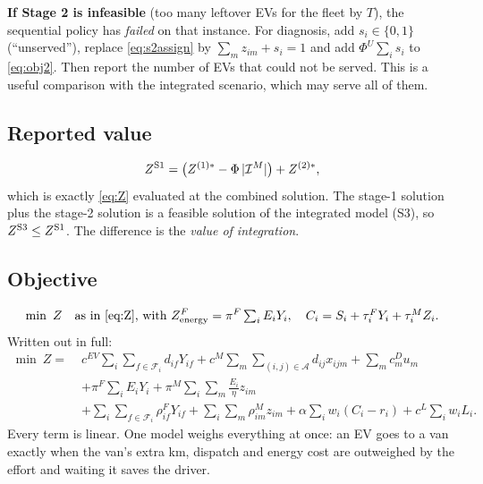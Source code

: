 \documentclass[11pt,a4paper]{article}
\newif\ifTOU \TOUfalse   %
\newcommand{\I}{\mathcal{I}}
\newcommand{\F}{\mathcal{F}}
\newcommand{\A}{\mathcal{A}}
\newcommand{\pk}{\mathrm{pk}}
\newcommand{\off}{\mathrm{off}}
\begin{document}
\textbf{If Stage 2 is infeasible} (too many leftover EVs for the fleet by $T$), the sequential policy has \emph{failed} on that instance. For diagnosis, add $s_i\in\{0,1\}$ (``unserved''), replace \eqref{eq:s2assign} by $\sum_mz_{im}+s_i=1$ and add $\Phi^U\sum_is_i$ to \eqref{eq:obj2}. Then report the number of EVs that could not be served. This is a useful comparison with the integrated scenario, which may serve all of them.

\subsection{Reported value}
\[
Z^{\text{S\scen}}=\big(Z^{(1)*}-\Phi\,|\I^M|\big)+Z^{(2)*},
\]
which is exactly \eqref{eq:Z} evaluated at the combined solution. The stage-1 solution plus the stage-2 solution is a feasible solution of the integrated model (S\ifTOU 4\else 3\fi), so
$Z^{\text{S\ifTOU 4\else 3\fi}}\le Z^{\text{S\scen}}$. The difference is the \emph{value of integration}.

\else
\subsection{Objective}
\begin{equation}
\min\ Z \quad\text{as in \eqref{eq:Z}, with }Z^F_{\text{energy}}=\ifTOU P^F\textstyle\sum_i\big[\pi^\off(\theta^1_i+\theta^3_i)+\pi^\pk\theta^2_i\big]\else\pi^F\textstyle\sum_iE_iY_i\fi,\quad C_i=S_i+\tau^F_iY_i+\tau^M_iZ_i. \label{eq:objint}
\end{equation}
Written out in full:
\begin{align*}
\min\ Z=\;& c^{EV}\sum_i\sum_{f\in\F_i}d_{if}Y_{if}+c^M\sum_m\sum_{(i,j)\in\A}d_{ij}x_{ijm}+\sum_mc^D_mu_m\\
&+\ifTOU P^F\sum_i\big[\pi^\off(\theta^1_i+\theta^3_i)+\pi^\pk\theta^2_i\big]\else\pi^F\sum_iE_iY_i\fi
+\pi^M\sum_i\sum_m\frac{E_i}{\eta}z_{im}\\
&+\sum_i\sum_{f\in\F_i}\rho^F_{if}Y_{if}+\sum_i\sum_m\rho^M_{im}z_{im}+\alpha\sum_iw_i(C_i-r_i)+c^L\sum_iw_iL_i .
\end{align*}
Every term is linear. One model weighs everything at once: an EV goes to a van exactly when the van's extra km, dispatch and energy cost are outweighed by the effort and waiting it saves the driver\ifTOU, or by the peak-price energy it avoids\fi.
\end{document}
